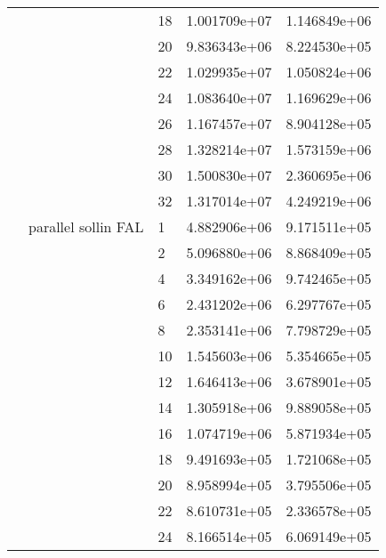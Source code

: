 \begin{tabular}{lllrr}
                      &                     & 18 &  1.001709e+07 &  1.146849e+06 \\
                      &                     & 20 &  9.836343e+06 &  8.224530e+05 \\
                      &                     & 22 &  1.029935e+07 &  1.050824e+06 \\
                      &                     & 24 &  1.083640e+07 &  1.169629e+06 \\
                      &                     & 26 &  1.167457e+07 &  8.904128e+05 \\
                      &                     & 28 &  1.328214e+07 &  1.573159e+06 \\
                      &                     & 30 &  1.500830e+07 &  2.360695e+06 \\
                      &                     & 32 &  1.317014e+07 &  4.249219e+06 \\
                      & parallel sollin FAL & 1  &  4.882906e+06 &  9.171511e+05 \\
                      &                     & 2  &  5.096880e+06 &  8.868409e+05 \\
                      &                     & 4  &  3.349162e+06 &  9.742465e+05 \\
                      &                     & 6  &  2.431202e+06 &  6.297767e+05 \\
                      &                     & 8  &  2.353141e+06 &  7.798729e+05 \\
                      &                     & 10 &  1.545603e+06 &  5.354665e+05 \\
                      &                     & 12 &  1.646413e+06 &  3.678901e+05 \\
                      &                     & 14 &  1.305918e+06 &  9.889058e+05 \\
                      &                     & 16 &  1.074719e+06 &  5.871934e+05 \\
                      &                     & 18 &  9.491693e+05 &  1.721068e+05 \\
                      &                     & 20 &  8.958994e+05 &  3.795506e+05 \\
                      &                     & 22 &  8.610731e+05 &  2.336578e+05 \\
                      &                     & 24 &  8.166514e+05 &  6.069149e+05 \\

\end{tabular}
